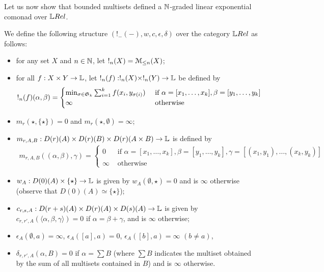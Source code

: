 Let us now show that bounded multisets defined a $\mathbb{N}$-graded linear exponential comonad over $\LREL$.

\begin{definition}
We define the following structure $(!_{-}(-),w,c,\epsilon,\delta)$ over the category $\LREL$ as follows:
\begin{itemize}
\item for any set $X$ and $n\in \mathbb{N}$, let $!_{n}(X)=\mathcal{M}_{\leq n}(X)$;

\item for all $f: X\times Y\to \mathbb{L}$, let $!_{n}(f): !_{n}(X)\times !_{n}(Y)\to \mathbb{L}$ be defined by 
\begin{align*}
!_{n}(f)(\alpha,\beta)=
\begin{cases}
\min_{\sigma\in \mathfrak{S}_{k}}\sum_{i=1}^{k}f(x_{i},y_{\sigma(i)}) & 
\text{ if }\alpha=[x_{1},\dots, x_{k}], \beta=[y_{1},\dots, y_{k}]\\
\infty & \text{ otherwise}
\end{cases}
\end{align*}


\item $m_{r}(\star, \{\star\})=0$ and $m_{r}(\star, \emptyset)=\infty$;

\item $m_{r,A,B}: D(r)(A)\times D(r)(B)\times D(r)(A\times B)\to \mathbb{L}$ is defined by 
\begin{align*}
m_{r,A,B}((\alpha,\beta), \gamma)=
\begin{cases}
0 & \text{ if } \alpha=[x_{1},\dots, x_{k}], \beta=[y_{1},\dots, y_{k}], \gamma= [(x_{1},y_{1}),\dots, (x_{k},y_{k})]\\
\infty & \text{ otherwise}
\end{cases}
\end{align*}

\item $w_{A}:D(0)(A)\times \{\star\}\to \mathbb{L}$ is given by $w_{A}(\emptyset, \star)=0$ and is $\infty$ otherwise (observe that $D(0)(A)\simeq \{\star\}$);

\item $c_{r,s,A}: D(r+s)(A)\times D(r)(A)\times D(s)(A)\to \mathbb{L}$ is given by $c_{r,r',A}(\langle\alpha, \beta,\gamma\rangle)=0$ if $\alpha=\beta+\gamma$, and is $\infty$ otherwise;

\item $\epsilon_{A}(\emptyset, a)=\infty$, $\epsilon_{A}([a],a)=0$, $\epsilon_{A}([b],a)=\infty$ $(b\neq a)$,

\item $\delta_{r,r',A}(\alpha, B)=0$ if $\alpha= \sum B$ (where $\sum B$ indicates the multiset obtained by the sum of all multisets contained in $B$) and is $\infty$ otherwise.




\end{itemize}

\end{definition}

